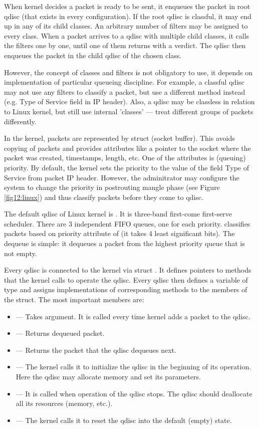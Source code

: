 When kernel decides a packet is ready to be sent, it enqueues the packet in root qdisc (that exists in every configuration). If the root qdisc is classful, it may end up in any of its child classes. An arbitrary number of filters may be assigned to every class. When a packet arrives to a qdisc with multiple child classes, it calls the filters one by one, until one of them returns with a verdict. The qdisc then enqueues the packet in the child qdisc of the chosen class.

However, the concept of classes and filters is not obligatory to use, it depends on implementation of particular queueing discipline. For example, a classful qdisc may not use any filters to classify a packet, but use a different method instead (e.g. Type of Service field in IP header). Also, a qdisc may be classless in relation to Linux kernel, but still use internal 'classes' --- treat different groups of packets differently.

In the kernel, packets are represented by struct  (socket buffer). This avoids copying of packets and provides attributes like a pointer to the socket where the packet was created, timestamps, length, etc. One of the attributes is (queuing) priority. By default, the kernel sets the priority to the value of the field Type of Service from packet IP header. However, the adminitrator may configure the system to change the priority in postrouting mangle phase (see Figure \ref{fig12:linux}) and thus classify packets before they come to qdisc.

The default qdisc of Linux kernel is . It is three-band first-come first-serve scheduler. There are 3 independent FIFO queues, one for each priority.  classifies packets based on priority attribute of  (it takes 4 least significant bits). The dequeue is simple: it dequeues a packet from the highest priority queue that is not empty.

Every qdisc is connected to the kernel via struct . It defines pointers to methods that the kernel calls to operate the qdisc. Every qdisc then defines a variable of type  and assigns implementations of corresponding methods to the members of the struct. The most important members are:
\begin{itemize}
	\item {} --- Takes  argument. It is called every time kernel adds a packet to the qdisc.
	\item {} --- Returns dequeued packet.
	\item {} --- Returns the packet that the qdisc dequeues next.
	\item {} --- The kernel calls it to initialize the qdisc in the beginning of its operation. Here the qdisc may allocate memory and set its parameters.
	\item {} --- It is called when operation of the qdisc stops. The qdisc should deallocate all its resources (memory, etc.).
	\item {} --- The kernel calls it to reset the qdisc into the default (empty) state.
\end{itemize}

